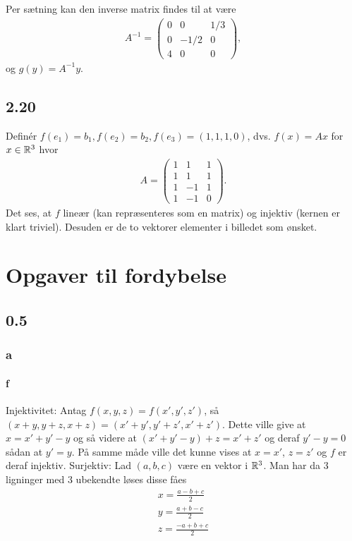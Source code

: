 			Per sætning \cite[2.4.12]{hesselholt2017} kan den inverse matrix findes til at være 
				\begin{align*}
					A^{-1}=\left(\begin{array}{ccc}{0} & {0} & {1/3} \\ {0} & {-1/2} & {0} \\ {4} & {0} & {0} \end{array}\right),
				\end{align*} 
			og $g(y)=A^{-1}y$.

		\subsection{2.20} Definér $f(e_1) = b_1, f(e_2) = b_2, f(e_3)=(1, 1, 1, 0)$, dvs. $f(x) = Ax$ for $x \in \mathbb{R}^3$ hvor
		    \begin{align*}
				A =\left(\begin{array}{ccc}
				1 & 1  & 1 \\
				1 & 1  & 1 \\
				1 & -1 & 1 \\
				1 & -1 & 0
				\end{array}\right).
			\end{align*}
        Det ses, at $f$ lineær (kan repræsenteres som en matrix) og injektiv (kernen er klart triviel). Desuden er de to vektorer elementer i billedet som ønsket.
	\section{Opgaver til fordybelse}

		\subsection{0.5} 

			\subsubsection{a} 

			\paragraph{f} Injektivitet: Antag $f(x,y,z)=f(x',y',z')$, så $(x+y,y+z,x+z)=(x'+y',y'+z',x'+z')$. Dette ville give at $x=x'+y'-y$ og så videre at $(x'+y'-y)+z=x'+z'$ og deraf $y'-y=0$ sådan at $y'=y$. På samme måde ville det kunne vises at $x=x'$, $z=z'$ og $f$ er deraf injektiv. Surjektiv: Lad $(a,b,c)$ være en vektor i $\mathbb{R}^3$. Man har da 3 ligninger med 3 ubekendte løses disse fåes
				\begin{align*}
					x=\frac{a-b+c}{2}\\
					y=\frac{a+b-c}{2}\\
					z=\frac{-a+b+c}{2}
				\end{align*} 

